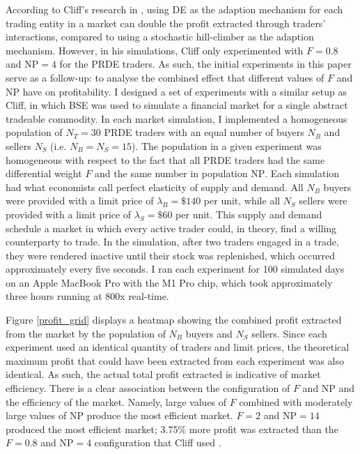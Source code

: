 \documentclass[conference]{IEEEtran}
\begin{document}
According to Cliff's research in \cite{PRDE}, using DE as the adaption mechanism for each trading entity in a market can double the profit extracted through traders' interactions, compared to using a stochastic hill-climber as the adaption mechanism.
However, in his simulations, Cliff only experimented with $F=0.8$ and $\mathrm{NP}=4$ for the PRDE traders.
As such, the initial experiments in this paper serve as a follow-up: to analyse the combined effect that different values of $F$ and $\mathrm{NP}$ have on profitability.
I designed a set of experiments with a similar setup as Cliff, in which BSE was used to simulate a financial market for a single abstract tradeable commodity.
In each market simulation, I implemented a homogeneous population of $N_T=30$ PRDE traders with an equal number of buyers $N_B$ and sellers $N_S$ (i.e. $N_B=N_S=15$).
The population in a given experiment was homogeneous with respect to the fact that all PRDE traders had the same differential weight $F$ and the same number in population $\mathrm{NP}$.
Each simulation had what economists call perfect elasticity of supply and demand.
All $N_B$ buyers were provided with a limit price of $\lambda_B=\$140$ per unit, while all $N_S$ sellers were provided with a limit price of $\lambda_S=\$60$ per unit.
This supply and demand schedule a market in which every active trader could, in theory, find a willing counterparty to trade.
In the simulation, after two traders engaged in a trade, they were rendered inactive until their stock was replenished, which occurred approximately every five seconds.
I ran each experiment for 100 simulated days on an Apple MacBook Pro with the M1 Pro chip, which took approximately three hours running at 800x real-time.

Figure \ref{profit_grid} displays a heatmap showing the combined profit extracted from the market by the population of $N_B$ buyers and $N_S$ sellers.
Since each experiment used an identical quantity of traders and limit prices, the theoretical maximum profit that could have been extracted from each experiment was also identical.
As such, the actual total profit extracted is indicative of market efficiency.
There is a clear association between the configuration of $F$ and $\mathrm{NP}$ and the efficiency of the market.
Namely, large values of $F$ combined with moderately large values of $\mathrm{NP}$ produce the most efficient market.
$F=2$ and $\mathrm{NP}=14$ produced the most efficient market; 3.75\% more profit was extracted than the $F=0.8$ and $\mathrm{NP}=4$ configuration that Cliff used \cite{PRDE}.
\end{document}
